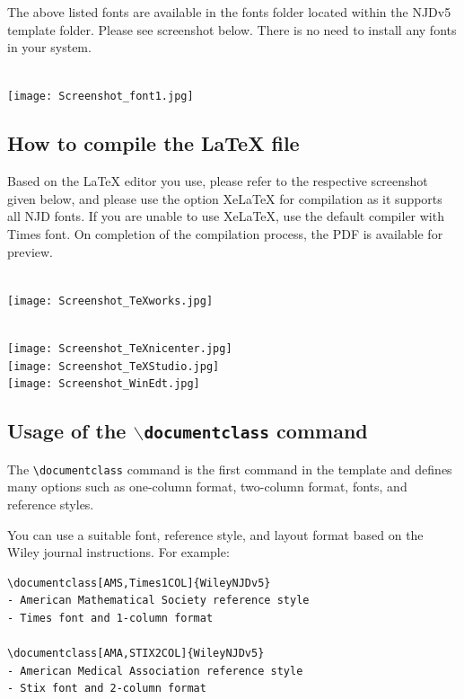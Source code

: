 \documentclass[11pt]{article}
\begin{document}
The above listed fonts are available in the fonts folder located within the NJDv5 template folder. Please see screenshot below. There is no need to install any fonts in your system.
\vskip10pt

\\[10pt]
\texttt{[image: Screenshot\_font1.jpg]}
\vskip20pt


\subsection{How to compile the LaTeX f{i}le}

Based on the LaTeX editor you use, please refer to the respective screenshot given below, and please use the option XeLaTeX for compilation as it supports all NJD fonts. If you are unable to use XeLaTeX, use the default compiler with Times font. On completion of the compilation process, the PDF is available for preview.

\vskip15pt
\\[10pt]
\texttt{[image: Screenshot\_TeXworks.jpg]}

\clearpage

\\[10pt]
\texttt{[image: Screenshot\_TeXnicenter.jpg]}
\vskip15pt
\\[10pt]
\texttt{[image: Screenshot\_TeXStudio.jpg]}
\vskip15pt
\\[10pt]
\texttt{[image: Screenshot\_WinEdt.jpg]}
\vskip20pt

\pagebreak

\subsection{Usage of the {\tt $\backslash$documentclass} command}

The \verb|\documentclass| command is the f{i}rst command in the template and def{i}nes many options such as one-column format, two-column format, fonts, and reference styles.

You can use a suitable font, reference style, and layout format based on the Wiley journal instructions. For example:
\begin{verbatim}
\documentclass[AMS,Times1COL]{WileyNJDv5}
- American Mathematical Society reference style
- Times font and 1-column format

\documentclass[AMA,STIX2COL]{WileyNJDv5}
- American Medical Association reference style
- Stix font and 2-column format
\end{verbatim}
\end{document}
